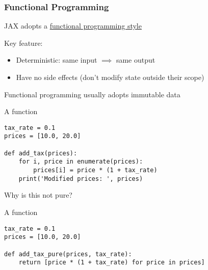 \begin{frame}
    \frametitle{Functional Programming}
    
    JAX adopts a \underline{functional programming style}

    \vspace{0.5em}
    \vspace{0.5em}
    \vspace{0.5em}
    \vspace{0.5em}
    Key feature: 

    \begin{itemize}
        \item Deterministic: same input $\implies$ same output 
        \vspace{0.5em}
        \item Have no side effects (don't modify state outside their scope)
    \end{itemize}


        \vspace{0.5em}
        \vspace{0.5em}
        \vspace{0.5em}
    Functional programming usually adopts immutable data

\end{frame}


\begin{frame}[fragile]

    A  function
    \vspace{0.5em}
    \vspace{0.5em}

    \begin{verbatim}
tax_rate = 0.1 
prices = [10.0, 20.0] 

def add_tax(prices):
    for i, price in enumerate(prices):
        prices[i] = price * (1 + tax_rate)    
    print('Modified prices: ', prices)
    \end{verbatim}

    \vspace{0.5em}
    \vspace{0.5em}
    \vspace{0.5em}
    Why is this not pure?
    
\end{frame}



\begin{frame}[fragile]

    A  function
    \vspace{0.5em}
    \vspace{0.5em}

    \begin{verbatim}
tax_rate = 0.1 
prices = [10.0, 20.0] 

def add_tax_pure(prices, tax_rate):
    return [price * (1 + tax_rate) for price in prices]
    \end{verbatim}
    
\end{frame}


